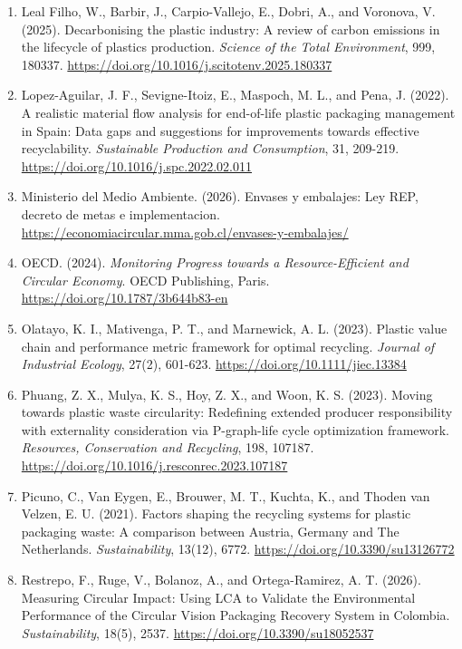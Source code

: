 \documentclass[review,10pt]{elsarticle}
\newcommand{\changepar}[1]{#1\par\medskip}
\begin{document}
\begin{enumerate}[leftmargin=*]
\item \changepar{Leal Filho, W., Barbir, J., Carpio-Vallejo, E., Dobri, A., and Voronova, V. (2025). Decarbonising the plastic industry: A review of carbon emissions in the lifecycle of plastics production. \textit{Science of the Total Environment}, 999, 180337. \url{https://doi.org/10.1016/j.scitotenv.2025.180337}}

\item \changepar{Lopez-Aguilar, J. F., Sevigne-Itoiz, E., Maspoch, M. L., and Pena, J. (2022). A realistic material flow analysis for end-of-life plastic packaging management in Spain: Data gaps and suggestions for improvements towards effective recyclability. \textit{Sustainable Production and Consumption}, 31, 209-219. \url{https://doi.org/10.1016/j.spc.2022.02.011}}

\item \changepar{Ministerio del Medio Ambiente. (2026). Envases y embalajes: Ley REP, decreto de metas e implementacion. \url{https://economiacircular.mma.gob.cl/envases-y-embalajes/}}

\item \changepar{OECD. (2024). \textit{Monitoring Progress towards a Resource-Efficient and Circular Economy}. OECD Publishing, Paris. \url{https://doi.org/10.1787/3b644b83-en}}

\item \changepar{Olatayo, K. I., Mativenga, P. T., and Marnewick, A. L. (2023). Plastic value chain and performance metric framework for optimal recycling. \textit{Journal of Industrial Ecology}, 27(2), 601-623. \url{https://doi.org/10.1111/jiec.13384}}

\item \changepar{Phuang, Z. X., Mulya, K. S., Hoy, Z. X., and Woon, K. S. (2023). Moving towards plastic waste circularity: Redefining extended producer responsibility with externality consideration via P-graph-life cycle optimization framework. \textit{Resources, Conservation and Recycling}, 198, 107187. \url{https://doi.org/10.1016/j.resconrec.2023.107187}}

\item \changepar{Picuno, C., Van Eygen, E., Brouwer, M. T., Kuchta, K., and Thoden van Velzen, E. U. (2021). Factors shaping the recycling systems for plastic packaging waste: A comparison between Austria, Germany and The Netherlands. \textit{Sustainability}, 13(12), 6772. \url{https://doi.org/10.3390/su13126772}}

\item \changepar{Restrepo, F., Ruge, V., Bolanoz, A., and Ortega-Ramirez, A. T. (2026). Measuring Circular Impact: Using LCA to Validate the Environmental Performance of the Circular Vision Packaging Recovery System in Colombia. \textit{Sustainability}, 18(5), 2537. \url{https://doi.org/10.3390/su18052537}}


\end{enumerate}
\end{document}

